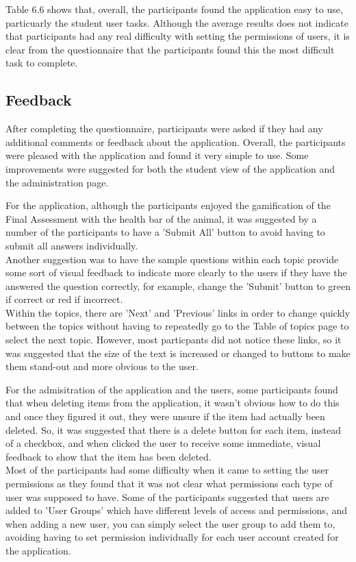 \documentclass{l3proj}
\begin{document}
Table 6.6 shows that, overall, the participants found the application easy to use, particuarly the student user tasks.
Although the average results does not indicate that participants had any real difficulty with setting the permissions of users, it is clear from the questionnaire that the participants found this the most difficult task to complete.

\subsection{Feedback}

After completing the questionnaire, participants were asked if they had any additional comments or feedback about the application. Overall, the participants were pleased with the application and found it very simple to use. Some improvements were suggested for both the student view of the application and the administration page.

For the application, although the participants enjoyed the gamification of the Final Assessment with the health bar of the animal, it was suggested by a number of the participants to have a 'Submit All' button to avoid having to submit all answers individually.\\
Another suggestion was to have the sample questions within each topic provide some sort of visual feedback to indicate more clearly to the users if they have the answered the question correctly, for example, change the 'Submit' button to green if correct or red if incorrect.\\
Within the topics, there are 'Next' and 'Previous' links in order to change quickly between the topics without having to repeatedly go to the Table of topics page to select the next topic. However, most particpants did not notice these links, so it was suggested that the size of the text is increased or changed to buttons to make them stand-out and more obvious to the user.

For the admisitration of the application and the users, some participants found that when deleting items from the application, it wasn't obvious how to do this and once they figured it out, they were unsure if the item had actually been deleted. So, it was suggested that there is a delete button for each item, instead of a checkbox, and when clicked the user to receive some immediate, visual feedback to show that the item has been deleted.\\ 
Most of the participants had some difficulty when it came to setting the user permissions as they found that it was not clear what permissions each type of user was supposed to have. Some of the participants suggested that users are added to  'User Groups' which have different levels of access and permissions, and when adding a new user, you can simply select the user group to add them to, avoiding having to set permission individually for each user account created for the application.
\end{document}

